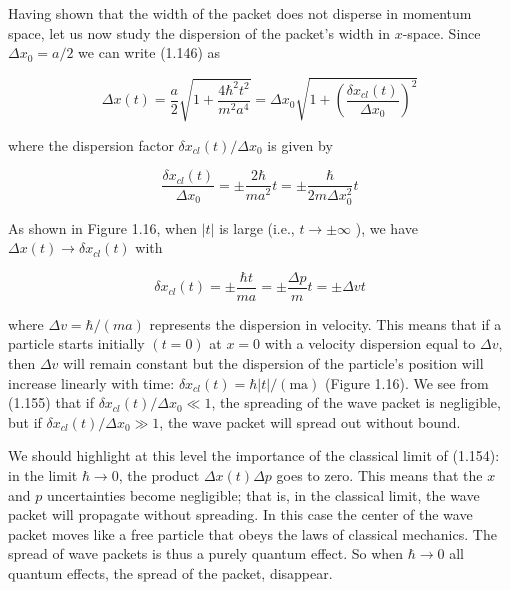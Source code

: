 \documentclass[10pt]{article}
\begin{document}
Having shown that the width of the packet does not disperse in momentum space, let us now study the dispersion of the packet's width in $x$-space. Since $\Delta x_{0}=a / 2$ we can write (1.146) as


\begin{equation*}
\Delta x(t)=\frac{a}{2} \sqrt{1+\frac{4 \hbar^{2} t^{2}}{m^{2} a^{4}}}=\Delta x_{0} \sqrt{1+\left(\frac{\delta x_{c l}(t)}{\Delta x_{0}}\right)^{2}} \tag{1.155}
\end{equation*}


where the dispersion factor $\delta x_{c l}(t) / \Delta x_{0}$ is given by


\begin{equation*}
\frac{\delta x_{c l}(t)}{\Delta x_{0}}= \pm \frac{2 \hbar}{m a^{2}} t= \pm \frac{\hbar}{2 m \Delta x_{0}^{2}} t \tag{1.156}
\end{equation*}


As shown in Figure 1.16, when $|t|$ is large (i.e., $t \rightarrow \pm \infty$ ), we have $\Delta x(t) \rightarrow \delta x_{c l}(t)$ with


\begin{equation*}
\delta x_{c l}(t)= \pm \frac{\hbar t}{m a}= \pm \frac{\Delta p}{m} t= \pm \Delta v t \tag{1.157}
\end{equation*}


where $\Delta v=\hbar /(m a)$ represents the dispersion in velocity. This means that if a particle starts initially $(t=0)$ at $x=0$ with a velocity dispersion equal to $\Delta v$, then $\Delta v$ will remain constant but the dispersion of the particle's position will increase linearly with time: $\delta x_{c l}(t)=\hbar|t| /(\mathrm{ma})$ (Figure 1.16). We see from (1.155) that if $\delta x_{c l}(t) / \Delta x_{0} \ll 1$, the spreading of the wave packet is negligible, but if $\delta x_{c l}(t) / \Delta x_{0} \gg 1$, the wave packet will spread out without bound.

We should highlight at this level the importance of the classical limit of (1.154): in the limit $\hbar \rightarrow 0$, the product $\Delta x(t) \Delta p$ goes to zero. This means that the $x$ and $p$ uncertainties become negligible; that is, in the classical limit, the wave packet will propagate without spreading. In this case the center of the wave packet moves like a free particle that obeys the laws of classical mechanics. The spread of wave packets is thus a purely quantum effect. So when $\hbar \rightarrow 0$ all quantum effects, the spread of the packet, disappear.
\end{document}
